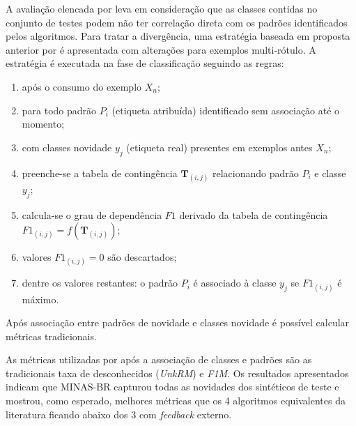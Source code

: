 
A avaliação elencada por  leva em consideração que as classes
contidas no conjunto de testes podem não ter correlação direta com os padrões identificados
pelos algoritmos.
Para tratar a divergência, uma estratégia baseada em proposta anterior por
 é apresentada com alterações para exemplos multi-rótulo.
A estratégia é executada na fase de classificação seguindo as regras:

\begin{enumerate}

    \item após o consumo do exemplo $X_n$;
    
    \item para todo padrão $P_i$ (etiqueta atribuída) identificado sem
    associação até o momento;
    
    \item com classes novidade $y_j$ (etiqueta real) presentes em exemplos antes
    $X_n$;
    
    \item preenche-se a tabela de contingência $\mathbf{T}_{(i,j)}$ relacionando
    padrão $P_i$ e classe $y_j$;
    
    \item calcula-se o grau de dependência $\mathit{F1}$ derivado da tabela de
    contingência $\mathit{F1}_{(i,j)} = f(\mathbf{T}_{(i,j)})$;
    
    \item valores $\mathit{F1}_{(i,j)} = 0$ são descartados;
    
    \item dentre os valores restantes: o padrão $P_i$ é associado à classe $y_j$
    se $\mathit{F1}_{(i,j)}$ é máximo.

\end{enumerate}

Após associação entre padrões de novidade e classes novidade é possível calcular
métricas tradicionais.

As métricas utilizadas por  após a associação de classes e
padrões são as tradicionais taxa de desconhecidos (\emph{UnkRM}) e \emph{F1M}.
Os resultados apresentados indicam que MINAS-BR capturou todas as novidades dos
\datasets sintéticos de teste e mostrou, como esperado, melhores métricas que os
4 algoritmos equivalentes da literatura ficando abaixo dos 3 com \emph{feedback}
externo.

